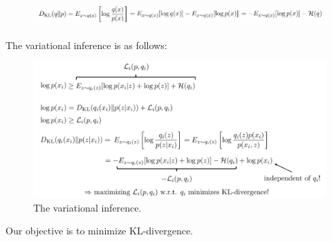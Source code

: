 \documentclass{article}
\begin{document}
\begin{figure}[h]
    \centering
	\includegraphics[width=\textwidth]{fig/kl.png}
\end{figure}

The variational inference is as follows:
\begin{figure}[h]
    \centering
	\includegraphics[width=\textwidth]{fig/variational_inference.png}
	\caption{The variational inference.}
\end{figure}
Our objective is to minimize KL-divergence.
\end{document}
